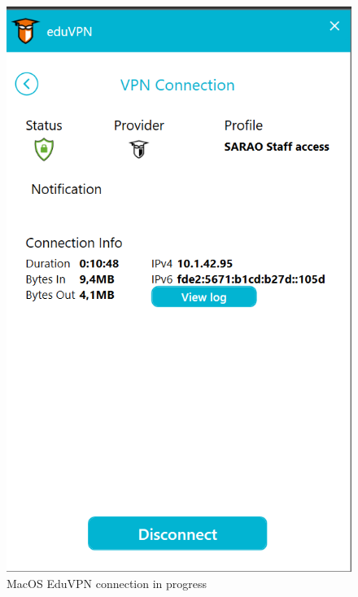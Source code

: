 \begin{figure}[!thb]
	\centering
	\includegraphics[scale=0.3]{Chapters/images/image58.png}
	
	\caption{MacOS EduVPN connection in progress }
	\label{fig:image58}
\end{figure}

